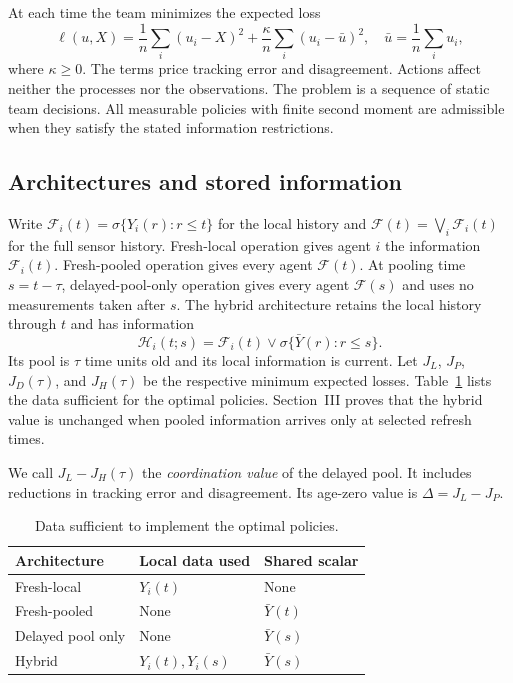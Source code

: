 \documentclass[letterpaper,10pt,conference]{ieeeconf}
\begin{document}
At each time the team minimizes the expected loss
\begin{equation}
 \ell(u,X)=\frac1n\sum_i(u_i-X)^2
       +\frac\kappa n\sum_i(u_i-\bar u)^2,
 \quad \bar u=\frac1n\sum_i u_i,\label{eq:loss}
\end{equation}
where $\kappa\ge0$. The terms price tracking error and disagreement. Actions affect neither the processes nor the observations. The problem is a sequence of static team decisions. All measurable policies with finite second moment are admissible when they satisfy the stated information restrictions.

\subsection{Architectures and stored information}
Write $\mathcal F_i(t)=\sigma\{Y_i(r):r\le t\}$ for the local history and $\mathcal F(t)=\bigvee_i\mathcal F_i(t)$ for the full sensor history. Fresh-local operation gives agent $i$ the information $\mathcal F_i(t)$. Fresh-pooled operation gives every agent $\mathcal F(t)$. At pooling time $s=t-\tau$, delayed-pool-only operation gives every agent $\mathcal F(s)$ and uses no measurements taken after $s$. The hybrid architecture retains the local history through $t$ and has information
\begin{equation}
 \mathcal H_i(t;s)=\mathcal F_i(t)\vee
             \sigma\{\bar Y(r):r\le s\}.\label{eq:hybrid}
\end{equation}
Its pool is $\tau$ time units old and its local information is current. Let $J_L$, $J_P$, $J_D(\tau)$, and $J_H(\tau)$ be the respective minimum expected losses. Table~\ref{tab:information} lists the data sufficient for the optimal policies. Section~III proves that the hybrid value is unchanged when pooled information arrives only at selected refresh times.

We call $J_L-J_H(\tau)$ the \emph{coordination value} of the delayed pool. It includes reductions in tracking error and disagreement. Its age-zero value is $\Delta=J_L-J_P$.

\begin{table}[t]
\vspace*{7pt} %
\caption{Data sufficient to implement the optimal policies.}
\label{tab:information}
\centering
\begin{tabular}{@{}lll@{}}
\toprule
Architecture & Local data used & Shared scalar \\
\midrule
Fresh-local & $Y_i(t)$ & None \\
Fresh-pooled & None & $\bar Y(t)$ \\
Delayed pool only & None & $\bar Y(s)$ \\
Hybrid & $Y_i(t),Y_i(s)$ & $\bar Y(s)$ \\
\bottomrule
\end{tabular}
\end{table}
\end{document}

